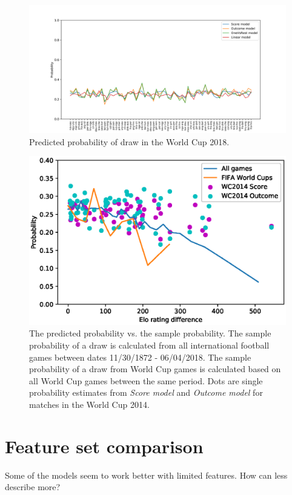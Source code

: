\begin{figure}[H]
    \centering
    \includegraphics[width=1\textwidth]{img/match_level_2018_model_probability_draw_prob.png}
    \caption{Predicted probability of draw in the World Cup 2018.}
    \label{fig:draw_probability}
\end{figure}

\begin{figure}[H]
    \centering
    \includegraphics[width=1\textwidth]{img/draw_true_probability_wc.eps}
    \caption{The predicted probability vs. the sample probability. The sample probability of a draw is calculated from all international football games between dates 11/30/1872 - 06/04/2018. The sample probability of a draw from World Cup games is calculated based on all World Cup games between the same period. Dots are single probability estimates from \textit{Score model} and \textit{Outcome model} for matches in the World Cup 2014.}
    \label{fig:draw_prob_dist}
\end{figure}

\section{Feature set comparison}
Some of the models seem to work better with limited features. How can less describe more?

